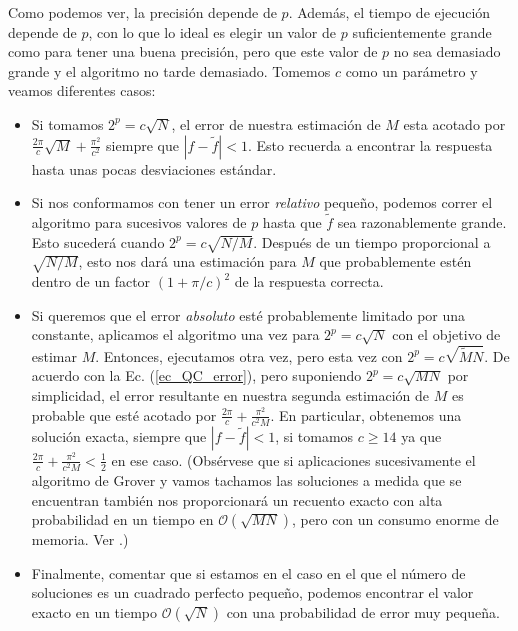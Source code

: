 \documentclass[a4paper,11pt]{book} %
\numberwithin{equation}{chapter}
\begin{document}
Como podemos ver, la precisión depende de $p$. Además, el tiempo de ejecución depende de $p$, con lo que lo ideal es elegir un valor de $p$ suficientemente grande como para tener una buena precisión, pero que este valor de $p$ no sea demasiado grande y el algoritmo no tarde demasiado. Tomemos $c$ como un parámetro y veamos diferentes casos:
\begin{itemize}
	\item Si tomamos $2^p = c \sqrt{N}$, el error de nuestra estimación de $M$ esta acotado por $\frac{2 \pi}{c} \sqrt{M} + \frac{\pi^2}{c^2}$ siempre que $|f - \tilde{f}| < 1$. Esto recuerda a encontrar la respuesta hasta unas pocas desviaciones estándar. 
	
	\item Si nos conformamos con tener un error \textit{relativo} pequeño, podemos correr el algoritmo para sucesivos valores de $p$ hasta que $\tilde{f}$ sea razonablemente grande. Esto sucederá cuando $2^p = c \sqrt{N/M}$. Después de un tiempo proporcional a $\sqrt{N/M}$, esto nos dará una estimación para $M$ que probablemente estén dentro de un factor $(1+ \pi/c)^2$ de la respuesta correcta. 
	
	\item Si queremos que el error \textit{absoluto} esté probablemente limitado por una constante, aplicamos el algoritmo una vez para $2^p = c \sqrt{N}$ con el objetivo de estimar $M$. Entonces, ejecutamos otra vez, pero esta vez con $2^p = c \sqrt{\tilde{M}N}$. De acuerdo con la Ec. (\ref{ec_QC_error}), pero suponiendo $2^p = c \sqrt{MN}$ por simplicidad, el error resultante en nuestra segunda estimación de $M$ es probable que esté acotado por $\frac{2 \pi}{c} + \frac{\pi^2}{c^2 M}$. En particular, obtenemos una solución exacta, siempre que $|f - \tilde{f}| < 1$, si tomamos $c \geq 14$ ya que $\frac{2 \pi}{c} + \frac{\pi^2}{c^2 M} < \frac{1}{2}$ en ese caso. (Obsérvese que si aplicaciones sucesivamente el algoritmo de Grover y vamos tachamos las soluciones a medida que se encuentran también nos proporcionará un recuento exacto con alta probabilidad en un tiempo en $\mathcal{O} (\sqrt{M N})$, pero con un consumo enorme de memoria. Ver \cite{bib_Approximate_QC}.)
	
	\item Finalmente, comentar que si estamos en el caso en el que el número de soluciones es un cuadrado perfecto pequeño, podemos encontrar el valor  exacto en un tiempo $\mathcal{O}(\sqrt{N})$ con una probabilidad de error muy pequeña. 
	
\end{itemize}
\end{document}
